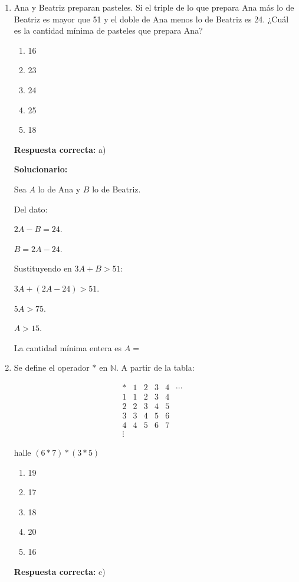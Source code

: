 \begin{enumerate}[resume]
	
	\vspace{6mm}
	
	\item Ana y Beatriz preparan pasteles. Si el triple de lo que prepara Ana más lo de Beatriz es mayor que 51 y el doble de Ana menos lo de Beatriz es 24. ¿Cuál es la cantidad mínima de pasteles que prepara Ana?
	\begin{enumerate}[label=\alph*)]
		\item 16
		\item 23
		\item 24
		\item 25
		\item 18
	\end{enumerate}
	\textbf{Respuesta correcta:} a)
	
	\vspace{2mm}
	\textbf{Solucionario:}
	
	Sea $A$ lo de Ana y $B$ lo de Beatriz.
	
	Del dato:
	
	$2A-B=24$.
	
	$B=2A-24$.
	
	Sustituyendo en $3A+B>51$:
	
	$3A+(2A-24)>51$.
	
	$5A>75$.
	
	$A>15$.
	
	La cantidad mínima entera es $A=$
	
	\vspace{6mm}
	
	\item Se define el operador $*$ en $\mathbb{N}$.
	A partir de la tabla:
	
	$$
	\begin{array}{c|cccccc}
		* & 1 & 2 & 3 & 4 & \cdots \\
		\hline
		1 & 1 & 2 & 3 & 4 & \\
		2 & 2 & 3 & 4 & 5 & \\
		3 & 3 & 4 & 5 & 6 & \\
		4 & 4 & 5 & 6 & 7 & \\
		\vdots & & & & & &
	\end{array}
	$$
	
	halle $(6*7)*(3*5)$
	\begin{enumerate}[label=\alph*)]
		\item 19
		\item 17
		\item 18
		\item 20
		\item 16
	\end{enumerate}
	\textbf{Respuesta correcta:} c)
	

\end{enumerate}
